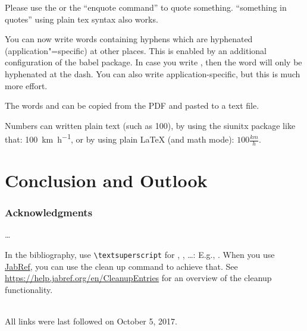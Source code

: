 \documentclass[english,runningheads,a4paper]{llncs}[2018/03/10]
\begin{document}
Please use the  or the \enquote{enquote command} to quote something.
``something in quotes'' using plain tex syntax also works.

You can now write words containing hyphens which are hyphenated (application"=specific) at other places.
This is enabled by an additional configuration of the babel package.
In case you write , then the word will only be hyphenated at the dash.
You can also write applica\allowbreak{}tion-specific, but this is much more effort.

The words  and  can be copied from the PDF and pasted to a text file.

Numbers can written plain text (such as 100), by using the siunitx package like that:
\SI{100}{\km\per\hour},
or by using plain \LaTeX{} (and math mode):
$100 \frac{\mathit{km}}{h}$.

\section{Conclusion and Outlook}
\label{sec:outlook}
\lipsum[1-2]

\subsubsection*{Acknowledgments}
\ldots

In the bibliography, use \texttt{\textbackslash textsuperscript} for , , \ldots:
E.g., .
When you use \href{https://www.jabref.org}{JabRef}, you can use the clean up command to achieve that.
See \url{https://help.jabref.org/en/CleanupEntries} for an overview of the cleanup functionality.

\renewcommand{\bibsection}{\section*{References}} %

\begingroup
  \ifluatex
  \else
  \fi
  \small %
  
\endgroup

\ \\
%
All links were last followed on October 5, 2017.
\end{document}

